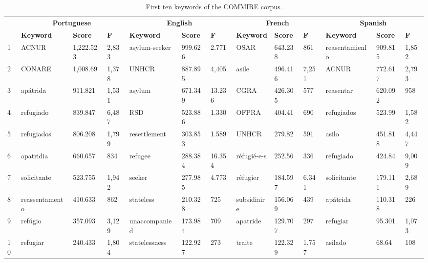\documentclass[english]{textolivre}
\begin{document}
\begin{description}
\begin{table}
\caption{First ten keywords of the COMMIRE corpus.}
\label{Table01}
\begin{tabular}{@{}lllllllllllll@{}}
\toprule
& \multicolumn{3}{c}{\textbf{Portuguese}} & \multicolumn{3}{c}{\textbf{English}} & \multicolumn{3}{c}{\textbf{French}} &
\multicolumn{3}{c}{\textbf{Spanish}} \\
& \textbf{Keyword} & \textbf{Score} & \textbf{F} & \textbf{Keyword} & \textbf{Score} & \textbf{F} & \textbf{Keyword} & \textbf{Score} &
\textbf{F} & \textbf{Keyword} & \textbf{Score} & \textbf{F} \\
1 & ACNUR & 1,222.523 & 2,833 & asylum-seeker & 999.626 & 2.771 & OSAR &
643.238 & 861 & reasentamienlo & 909.815 & 1,852\\
2 & CONARE & 1,008.69 & 1,378 & UNHCR & 887.895 & 4,405 & asile &
496.416 & 7,251 & ACNUR & 772.617 & 2,793\\
3 & apátrida & 911.821 & 1,531 & asylum & 671.349 & 13.236 & CGRA &
426.305 & 577 & reasentar & 620.092 & 958\\
4 & refugiado & 839.847 & 6,487 & RSD & 523.886 & 1.330 & OFPRA & 404.41
& 690 & refugiados & 523.99 & 1,582\\
5 & refugiados & 806.208 & 1,799 & resettlement & 303.853 & 1.589 &
UNHCR & 279.82 & 591 & asilo & 451.818 & 4,447\\
6 & apatridia & 660.657 & 834 & refugee & 288.384 & 16.354 & réfugié-e-s
& 252.56 & 336 & refugiado & 424.84 & 9,009\\
7 & solicitante & 523.755 & 1,942 & seeker & 277.985 & 4.773 & réfugier
& 184.597 & 6,341 & solicitante & 179.111 & 2,689\\
8 & reassentamento & 410.633 & 862 & stateless & 210.328 & 725 &
subsidiaire & 156.069 & 439 & apátrida & 110.318 & 226\\
9 & refúgio & 357.093 & 3,129 & unaccompanied & 173.984 & 709 & apatride
& 129.707 & 297 & refugiar & 95.301 & 1,073\\
10 & refugiar & 240.433 & 1,804 & statelessness & 122.927 & 273 & traite
& 122.329 & 1,757 & asilado & 68.64 & 108\\
\bottomrule
\end{tabular}
\end{table}



\end{description}
\end{document}
